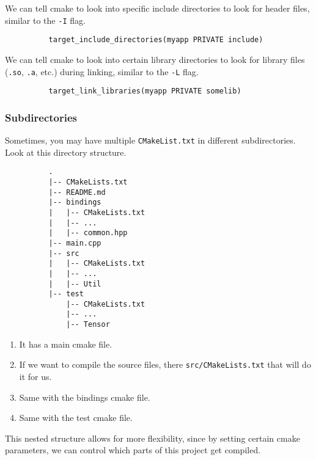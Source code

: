 \documentclass{article}
\begin{document}
      \begin{definition} 
        We can tell cmake to look into specific include directories to look for header files, similar to the \texttt{-I} flag. 
        \begin{lstlisting}
          target_include_directories(myapp PRIVATE include)
        \end{lstlisting}
      \end{definition}

      \begin{definition}
        We can tell cmake to look into certain library directories to look for library files (\texttt{.so}, \texttt{.a}, etc.) during linking, similar to the \texttt{-L} flag. 
        \begin{lstlisting}
          target_link_libraries(myapp PRIVATE somelib)
        \end{lstlisting}
      \end{definition}

    \subsubsection{Subdirectories}
  
      \begin{example}
        Sometimes, you may have multiple \texttt{CMakeList.txt} in different subdirectories. Look at this directory structure. 
        \begin{lstlisting}
          .
          |-- CMakeLists.txt
          |-- README.md
          |-- bindings
          |   |-- CMakeLists.txt
          |   |-- ...
          |   |-- common.hpp
          |-- main.cpp
          |-- src
          |   |-- CMakeLists.txt
          |   |-- ...
          |   |-- Util
          |-- test
              |-- CMakeLists.txt
              |-- ...
              |-- Tensor
        \end{lstlisting}
        \begin{enumerate}
          \item It has a main cmake file. 
          \item If we want to compile the source files, there \texttt{src/CMakeLists.txt} that will do it for us. 
          \item Same with the bindings cmake file. 
          \item Same with the test cmake file. 
        \end{enumerate}
        This nested structure allows for more flexibility, since by setting certain cmake parameters, we can control which parts of this project get compiled. 
      \end{example}
\end{document}
